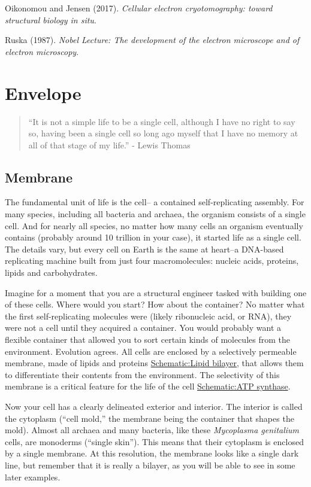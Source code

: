 \documentclass[]{tufte-book}
\begin{document}
Oikonomou and Jensen (2017). \emph{Cellular electron cryotomography:
toward structural biology in situ}.\citep{oikonomou2017}

Ruska (1987). \emph{Nobel Lecture: The development of the electron
microscope and of electron microscopy}.\citep{ruska1987}

\chapter{Envelope}\label{envelope}

\begin{quote}
``It is not a simple life to be a single cell, although I have no right
to say so, having been a single cell so long ago myself that I have no
memory at all of that stage of my life.'' - Lewis Thomas
\citep{thomas1990}
\end{quote}

\section{Membrane}\label{membrane}

The fundamental unit of life is the cell-- a contained self-replicating
assembly. For many species, including all bacteria and archaea, the
organism consists of a single cell. And for nearly all species, no
matter how many cells an organism eventually contains (probably around
10 trillion in your case), it started life as a single cell. The details
vary, but every cell on Earth is the same at heart--a DNA-based
replicating machine built from just four macromolecules: nucleic acids,
proteins, lipids and carbohydrates.

Imagine for a moment that you are a structural engineer tasked with
building one of these cells. Where would you start? How about the
container? No matter what the first self-replicating molecules were
(likely ribonucleic acid, or RNA), they were not a cell until they
acquired a container. You would probably want a flexible container that
allowed you to sort certain kinds of molecules from the environment.
Evolution agrees. All cells are enclosed by a selectively permeable
membrane, made of lipids and proteins
\protect\hyperlink{Lipid_bilayer}{Schematic:Lipid bilayer}, that allows
them to differentiate their contents from the environment. The
selectivity of this membrane is a critical feature for the life of the
cell
\protect\hyperlink{ATP_synthase_and_energy_production}{Schematic:ATP
synthase}.

Now your cell has a clearly delineated exterior and interior. The
interior is called the cytoplasm (``cell mold,'' the membrane being the
container that shapes the mold). Almost all archaea and many bacteria,
like these \emph{Mycoplasma genitalium} cells, are monoderms (``single
skin''). This means that their cytoplasm is enclosed by a single
membrane. At this resolution, the membrane looks like a single dark
line, but remember that it is really a bilayer, as you will be able to
see in some later examples.
\end{document}
